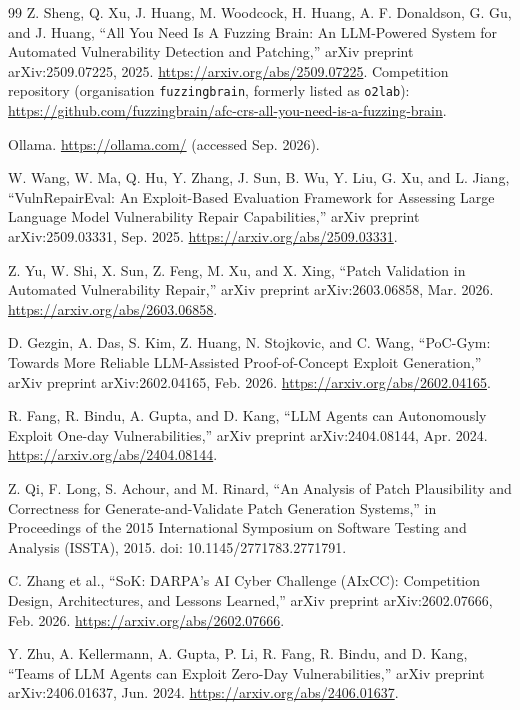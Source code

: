 \documentclass[12pt,a4paper]{report}
\begin{document}
\begin{thebibliography}{99}
 Z. Sheng, Q. Xu, J. Huang, M. Woodcock, H. Huang, A. F. Donaldson, G. Gu, and J. Huang, ``All You Need Is A Fuzzing Brain: An LLM-Powered System for Automated Vulnerability Detection and Patching,'' arXiv preprint arXiv:2509.07225, 2025. \url{https://arxiv.org/abs/2509.07225}. Competition repository (organisation \texttt{fuzzingbrain}, formerly listed as \texttt{o2lab}): \url{https://github.com/fuzzingbrain/afc-crs-all-you-need-is-a-fuzzing-brain}.

 Ollama. \url{https://ollama.com/} (accessed Sep. 2026).

 W. Wang, W. Ma, Q. Hu, Y. Zhang, J. Sun, B. Wu, Y. Liu, G. Xu, and L. Jiang, ``VulnRepairEval: An Exploit-Based Evaluation Framework for Assessing Large Language Model Vulnerability Repair Capabilities,'' arXiv preprint arXiv:2509.03331, Sep. 2025. \url{https://arxiv.org/abs/2509.03331}.

 Z. Yu, W. Shi, X. Sun, Z. Feng, M. Xu, and X. Xing, ``Patch Validation in Automated Vulnerability Repair,'' arXiv preprint arXiv:2603.06858, Mar. 2026. \url{https://arxiv.org/abs/2603.06858}.

 D. Gezgin, A. Das, S. Kim, Z. Huang, N. Stojkovic, and C. Wang, ``PoC-Gym: Towards More Reliable LLM-Assisted Proof-of-Concept Exploit Generation,'' arXiv preprint arXiv:2602.04165, Feb. 2026. \url{https://arxiv.org/abs/2602.04165}.

 R. Fang, R. Bindu, A. Gupta, and D. Kang, ``LLM Agents can Autonomously Exploit One-day Vulnerabilities,'' arXiv preprint arXiv:2404.08144, Apr. 2024. \url{https://arxiv.org/abs/2404.08144}.

 Z. Qi, F. Long, S. Achour, and M. Rinard, ``An Analysis of Patch Plausibility and Correctness for Generate-and-Validate Patch Generation Systems,'' in Proceedings of the 2015 International Symposium on Software Testing and Analysis (ISSTA), 2015. doi: 10.1145/2771783.2771791.

 C. Zhang et al., ``SoK: DARPA's AI Cyber Challenge (AIxCC): Competition Design, Architectures, and Lessons Learned,'' arXiv preprint arXiv:2602.07666, Feb. 2026. \url{https://arxiv.org/abs/2602.07666}.

 Y. Zhu, A. Kellermann, A. Gupta, P. Li, R. Fang, R. Bindu, and D. Kang, ``Teams of LLM Agents can Exploit Zero-Day Vulnerabilities,'' arXiv preprint arXiv:2406.01637, Jun. 2024. \url{https://arxiv.org/abs/2406.01637}.


\end{thebibliography}
\end{document}
